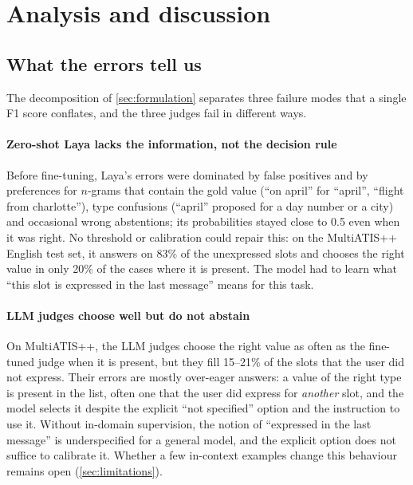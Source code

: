 \section{Analysis and discussion}
\label{sec:discussion}

\subsection{What the errors tell us}
\label{sec:errors}

The decomposition of \cref{sec:formulation} separates three failure modes that a single F1 score conflates, and the three judges fail in different ways.

\paragraph{Zero-shot Laya lacks the information, not the decision rule} Before fine-tuning, Laya's errors were dominated by false positives and by preferences for $n$-grams that contain the gold value (``on april'' for ``april'', ``flight from charlotte''), type confusions (``april'' proposed for a day number or a city) and occasional wrong abstentions; its probabilities stayed close to 0.5 even when it was right. No threshold or calibration could repair this: on the MultiATIS++ English test set, it answers on 83\% of the unexpressed slots and chooses the right value in only 20\% of the cases where it is present. The model had to learn what ``this slot is expressed in the last message'' means for this task.

\paragraph{LLM judges choose well but do not abstain} On MultiATIS++, the LLM judges choose the right value as often as the fine-tuned judge when it is present, but they fill 15--21\% of the slots that the user did not express. Their errors are mostly over-eager answers: a value of the right type is present in the list, often one that the user did express for \emph{another} slot, and the model selects it despite the explicit ``not specified'' option and the instruction to use it. Without in-domain supervision, the notion of ``expressed in the last message'' is underspecified for a general model, and the explicit option does not suffice to calibrate it. Whether a few in-context examples change this behaviour remains open (\cref{sec:limitations}).

